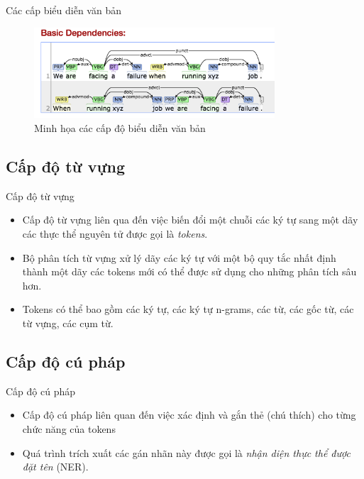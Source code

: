 \documentclass[10pt]{beamer}
\theoremstyle{remark}
\theoremstyle{definition}
\begin{document}
\begin{frame}{Các cấp biểu diễn văn bản}
	\begin{figure}[h!]
        \centering
        \includegraphics[width=0.8\textwidth]{QlGQ3.png}
        \caption{Minh họa các cấp độ biểu diễn văn bản}
        \label{fig:Dependency-Parsing}
    \end{figure}
\end{frame}

\subsection{Cấp độ từ vựng}

\begin{frame}{Cấp độ từ vựng}
	\begin{itemize}
		\item Cấp độ từ vựng liên qua đến việc biến đổi một chuỗi các ký tự sang một dãy các thực thể nguyên tử được gọi là \textit{tokens}.
		\item Bộ phân tích từ vựng xử lý dãy các ký tự với một bộ quy tắc nhất định thành một dãy các tokens mới có thể được sử dụng cho những phân tích sâu hơn.
		\item Tokens có thể bao gồm các ký tự, các ký tự n-grams, các từ, các gốc từ, các từ vựng, các cụm từ.
	\end{itemize}
    
\end{frame}

\subsection{Cấp độ cú pháp}

\begin{frame}{Cấp độ cú pháp}
	\begin{itemize}
		\item Cấp độ cú pháp liên quan đến việc xác định và gắn thẻ (chú thích) cho từng chức năng của tokens
		\item Quá trình trích xuất các gán nhãn này được gọi là \textit{nhận diện thực thể được đặt tên} (NER).
	\end{itemize}
\end{frame}
\end{document}
